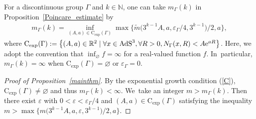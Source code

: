 \documentclass[10pt,a4paper]{amsart}
\numberwithin{equation}{section}
\begin{document}
For a discontinuous group $\Gamma$ and $k\in \mathbb{N}$,
one can take $m_{\Gamma}(k)$ in Proposition~\ref{Poincare_estimate} by
\begin{gather}
\label{Poincare_estimate}
m_{\Gamma}(k)=\inf_{(A,a)\in \mathrm{C_{exp}}(\Gamma)}
\max\big\{\tilde{m}\big(3^{k-1}A,a,\varepsilon_{\Gamma}/4,3^{k-1}\big)/2,a\big\},
\end{gather}
where $\mathrm{C_{exp}}(\Gamma):=\big\{(A,a)\in \mathbb{R}^{2} \mid
\forall x\in \mathrm{AdS}^{3},\forall R>0, N_{\Gamma}(x,R) < A{\rm e}^{aR}\big\}$.
Here,
we adopt the convention that $\inf_{\varnothing} f =\infty$ for a real-valued function $f$. In~particular,
$m_{\Gamma}(k)=\infty$ when $\mathrm{C_{exp}}(\Gamma)=\varnothing$
or $\varepsilon_{\Gamma}=0$.
\begin{proof}[Proof of Proposition~\ref{mainthm}]
By the exponential growth condition (\ref{C}), $\mathrm{C_{exp}}(\Gamma)\neq\varnothing$
and thus $m_{\Gamma}(k)<\infty$. We~take an integer $m >m_{\Gamma}(k)$.
Then there exist $\varepsilon$ with $0<\varepsilon<\varepsilon_{\Gamma}/4$
and $(A,a)\in\mathrm{C_{exp}}(\Gamma)$
satisfying the inequality
$m > \max\big\{m\big(3^{k-1}A,a,\varepsilon,3^{k-1}\big)/2,a\big\}$.


\end{proof}
\end{document}
